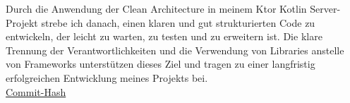 Durch die Anwendung der Clean Architecture in meinem Ktor Kotlin Server-Projekt strebe ich danach, einen klaren und gut strukturierten Code zu entwickeln, der leicht zu warten, zu testen und zu erweitern ist. Die klare Trennung der Verantwortlichkeiten und die Verwendung von Libraries anstelle von Frameworks unterstützen dieses Ziel und tragen zu einer langfristig erfolgreichen Entwicklung meines Projekts bei.\\

\href{https://github.com/lorenz1702/Task-Manager/commit/015f5d3147ca527bd73c6bdb2cdf9edba5121b28}{Commit-Hash}

